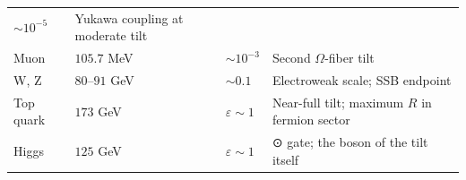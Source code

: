 \documentclass[12pt,a4paper]{article}
\begin{document}
\begin{longtable}[]{@{}llll@{}}
\begin{minipage}[t]{0.22\columnwidth}
\(\sim 10^{-5}\)\strut
\end{minipage} & \begin{minipage}[t]{0.22\columnwidth}\raggedright
Yukawa coupling at moderate tilt\strut
\end{minipage}\tabularnewline
\begin{minipage}[t]{0.22\columnwidth}\raggedright
Muon\strut
\end{minipage} & \begin{minipage}[t]{0.22\columnwidth}\raggedright
\(105.7\) MeV\strut
\end{minipage} & \begin{minipage}[t]{0.22\columnwidth}\raggedright
\(\sim 10^{-3}\)\strut
\end{minipage} & \begin{minipage}[t]{0.22\columnwidth}\raggedright
Second \(\Omega\)-fiber tilt\strut
\end{minipage}\tabularnewline
\begin{minipage}[t]{0.22\columnwidth}\raggedright
W, Z\strut
\end{minipage} & \begin{minipage}[t]{0.22\columnwidth}\raggedright
\(80\)--\(91\) GeV\strut
\end{minipage} & \begin{minipage}[t]{0.22\columnwidth}\raggedright
\(\sim 0.1\)\strut
\end{minipage} & \begin{minipage}[t]{0.22\columnwidth}\raggedright
Electroweak scale; SSB endpoint\strut
\end{minipage}\tabularnewline
\begin{minipage}[t]{0.22\columnwidth}\raggedright
Top quark\strut
\end{minipage} & \begin{minipage}[t]{0.22\columnwidth}\raggedright
\(173\) GeV\strut
\end{minipage} & \begin{minipage}[t]{0.22\columnwidth}\raggedright
\(\varepsilon \sim 1\)\strut
\end{minipage} & \begin{minipage}[t]{0.22\columnwidth}\raggedright
Near-full tilt; maximum \(R\) in fermion sector\strut
\end{minipage}\tabularnewline
\begin{minipage}[t]{0.22\columnwidth}\raggedright
Higgs\strut
\end{minipage} & \begin{minipage}[t]{0.22\columnwidth}\raggedright
\(125\) GeV\strut
\end{minipage} & \begin{minipage}[t]{0.22\columnwidth}\raggedright
\(\varepsilon \sim 1\)\strut
\end{minipage} & \begin{minipage}[t]{0.22\columnwidth}\raggedright
⊙ gate; the boson of the tilt itself\strut
\end{minipage}\tabularnewline
\bottomrule
\end{longtable}
\end{document}

